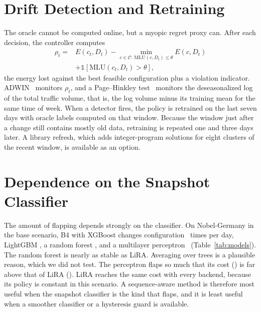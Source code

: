 \documentclass[preprint,12pt]{elsarticle}
\begin{document}
\section{Drift Detection and Retraining}\label{sec:drift}

The oracle cannot be computed online, but a myopic regret proxy can. After each decision, the controller computes
\begin{equation}\label{eq:proxy}
\begin{split}\rho_t=&E(c_t,D_t)-\min_{c\in\mathcal{C}:\,\mathrm{MLU}(c,D_t)\le\theta}E(c,D_t)\\
&+\mathbb{1}[\mathrm{MLU}(c_t,D_t)>\theta],\end{split}
\end{equation}
the energy lost against the best feasible configuration plus a violation indicator. ADWIN~\cite{bifet2007adwin} monitors $\rho_t$, and a Page--Hinkley test~\cite{page1954cusum} monitors the deseasonalized log of the total traffic volume, that is, the log volume minus its training mean for the same time of week. When a detector fires, the policy is retrained on the last seven days with oracle labels computed on that window. Because the window just after a change still contains mostly old data, retraining is repeated one and three days later. A library refresh, which adds integer-program solutions for eight clusters of the recent window, is available as an option.



\section{Dependence on the Snapshot Classifier}\label{sec:res-models}

The amount of flapping depends strongly on the classifier. On Nobel-Germany in the base scenario, B4 with XGBoost changes configuration \modXgbChg\ times per day, LightGBM \modLgbmChg, a random forest \modRfChg, and a multilayer perceptron \modMlpChg\ (Table~\ref{tab:models}). The random forest is nearly as stable as LiRA. Averaging over trees is a plausible reason, which we did not test. The perceptron flaps so much that its cost (\modMlpJ) is far above that of LiRA (\nobJlira). LiRA reaches the same cost with every backend, because its policy is constant in this scenario. A sequence-aware method is therefore most useful when the snapshot classifier is the kind that flaps, and it is least useful when a smoother classifier or a hysteresis guard is available.
\end{document}
